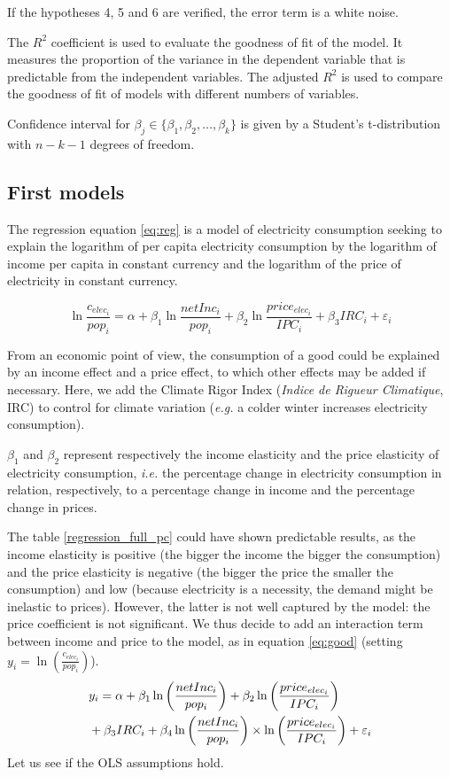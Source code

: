 If the hypotheses 4, 5 and 6 are verified, the error term is a white noise. 

The $R^2$ coefficient is used to evaluate the goodness of fit of the model. It measures the proportion of the variance in the dependent variable that is predictable from the independent variables. The adjusted $R^2$ is used to compare the goodness of fit of models with different numbers of variables.

Confidence interval for $\beta_j \in \{\beta_1, \beta_2, \ldots, \beta_k\}$ is given by a Student's t-distribution with $n - k - 1$ degrees of freedom.

\subsection{First models}
The regression equation \eqref{eq:reg} is a model of electricity consumption seeking to explain the logarithm of per capita electricity consumption by the logarithm of income per capita in constant currency and the logarithm of the price of electricity in constant currency. 

\begin{equation} \label{eq:reg}
\ln{\frac{c_{elec_i}}{pop_i}} = \alpha + \beta_1 \ln{\frac{{netInc_i}}{pop_i}} + \beta_2 \ln{\frac{price_{elec_i}}{IPC_i}} + \beta_3 IRC_i + \varepsilon_i
\end{equation}

From an economic point of view, the consumption of a good could be explained by an income effect and a price effect, to which other effects may be added if necessary. Here, we add the Climate Rigor Index (\textit{Indice de Rigueur Climatique}, IRC) to control for climate variation (\textit{e.g.} a colder winter increases electricity consumption).

$\beta_1$ and $\beta_2$ represent respectively the income elasticity and the price elasticity of electricity consumption, \textit{i.e.} the percentage change in electricity consumption in relation, respectively, to a percentage change in income and the percentage change in prices. 

The table \ref{regression_full_pc} could have shown predictable results, as the income elasticity is positive (the bigger the income the bigger the consumption) and the price elasticity is negative (the bigger the price the smaller the consumption) and low (because electricity is a necessity, the demand might be inelastic to prices). However, the latter is not well captured by the model: the price coefficient is not significant. We thus decide to add an interaction term between income and price to the model, as in equation \eqref{eq:good} (setting $y_i = \ln{\left(\frac{c_{elec_i}}{pop_i}\right)}$). 
\begin{align} \label{eq:good}
    &y_i = \alpha + \beta_1 \ln{\left(\frac{{netInc_i}}{pop_i}\right)} + \beta_2 \ln{\left(\frac{price_{elec_i}}{IPC_i}\right)} \notag \\
    &+ \beta_3 IRC_i + \beta_4 \ln{\left(\frac{{netInc_i}}{pop_i}\right)} \times \ln{\left(\frac{price_{elec_i}}{IPC_i}\right)} + \varepsilon_i
\end{align}
Let us see if the OLS assumptions hold. 

